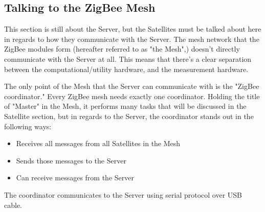 
\subsection{Talking to the ZigBee Mesh}
This section is still about the Server, but the Satellites must be talked about here in
regards to how they communicate with the Server. The mesh network that the ZigBee modules
form (hereafter referred to as "the Mesh",) doesn't directly communicate with the Server
at all. This means that there's a clear separation between the computational/utility
hardware, and the measurement hardware.

The only point of the Mesh that the Server can communicate with is the "ZigBee coordinator."
Every ZigBee mesh needs exactly one coordinator. Holding the title of "Master" in the
Mesh, it performs many tasks that will be discussed in the Satellite section, but in regards
to the Server, the coordinator stands out in the following ways:

\begin{itemize}
	\item Receives all messages from all Satellites in the Mesh
	\item Sends those messages to the Server
	\item Can receive messages from the Server
\end{itemize}

The coordinator communicates to the Server using serial protocol over USB cable. 

